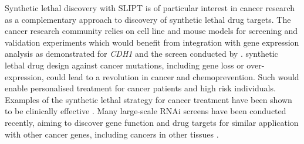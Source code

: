 Synthetic lethal discovery with \gls{SLIPT} is of particular interest in cancer research as a complementary approach to discovery of \gls{synthetic lethal} drug targets. The cancer research community relies on cell line and mouse models for screening and validation experiments \citep{Fece2015} which would benefit from integration with \gls{gene expression} analysis as demonstrated for \textit{CDH1} and the screen conducted by \citet{Telford2015}. \Gls{synthetic lethal} drug design against cancer \glspl{mutation}, including gene loss or over-expression, could lead to a revolution in cancer  and \gls{chemoprevention}. Such  would enable personalised \gls{treatment} for cancer patients and high risk individuals.  Examples of the \gls{synthetic lethal} strategy \citep{Farmer2005, Bryant2005} for cancer \gls{treatment} have been shown to be clinically effective \cite{McLachlan2016}. Many large-scale \gls{RNAi} screens have been conducted recently, aiming to discover gene function and drug targets for similar application with other cancer genes, including cancers in other tissues \citep{Fece2015}.



